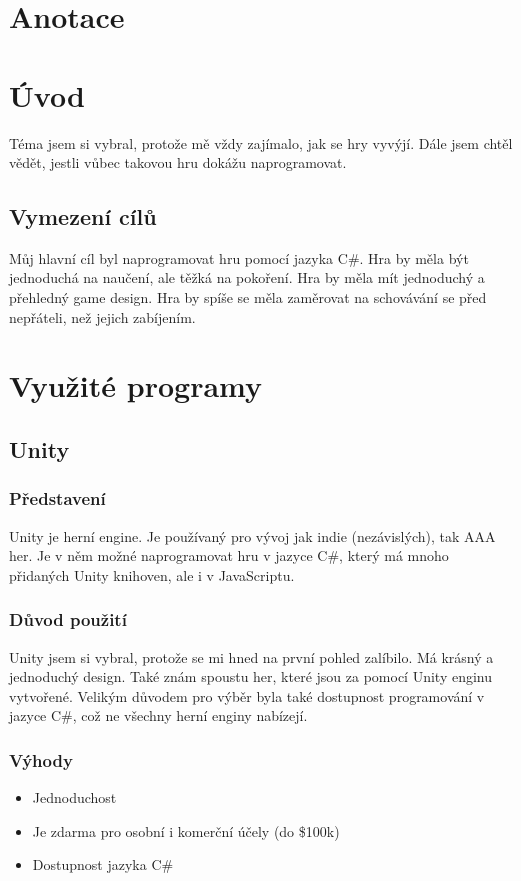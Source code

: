 \documentclass[12pt]{article}
\begin{document}
    \pagebreak
    \section*{Anotace}
    \pagebreak
    \tableofcontents
    
    \pagebreak
    \section{Úvod}
        Téma jsem si vybral, protože mě vždy zajímalo, jak se hry vyvýjí. Dále jsem chtěl vědět, jestli vůbec takovou hru dokážu naprogramovat.
        \subsection{Vymezení cílů}
            Můj hlavní cíl byl naprogramovat hru pomocí jazyka C\#. Hra by měla být jednoduchá na naučení, ale těžká na pokoření.\cite{website:ez2play-hard2master} Hra by měla mít jednoduchý a přehledný game design. Hra by spíše se měla zaměrovat na schovávání se před nepřáteli, než jejich zabíjením.
    \pagebreak
    \section{Využité programy}
    \subsection{Unity}
        \subsubsection{Představení}
            Unity je herní engine. %
            Je používaný pro vývoj jak indie (nezávislých), tak AAA her. Je v něm možné naprogramovat hru v jazyce C\#, který má mnoho přidaných Unity knihoven, ale i v JavaScriptu.
        \subsubsection{Důvod použití}
            Unity jsem si vybral, protože se mi hned na první pohled zalíbilo. Má krásný a jednoduchý design. Také znám spoustu her, které jsou za pomocí Unity enginu vytvořené. %
            Velikým důvodem pro výběr byla také dostupnost programování v jazyce C\#, což ne všechny herní enginy nabízejí.
            
        \subsubsection{Výhody}
            \begin{itemize}
                \item Jednoduchost
                \item Je zdarma pro osobní i komerční účely (do \$100k)
                \item Dostupnost jazyka C\#
            \end{itemize}
\end{document}

